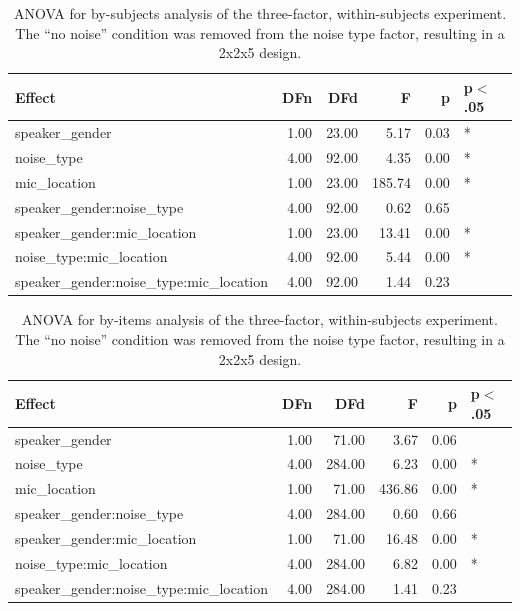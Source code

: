 \documentclass[dissertation,copyright]{uathesis}
\begin{document}
\begin{table}[ht]
\centering
\begin{tabular}{lrrrrl}
  \hline
Effect & DFn & DFd & F & p & p$<$.05 \\ 
  \hline
speaker\_gender & 1.00 & 23.00 & 5.17 & 0.03 & * \\ 
  noise\_type & 4.00 & 92.00 & 4.35 & 0.00 & * \\ 
  mic\_location & 1.00 & 23.00 & 185.74 & 0.00 & * \\ 
  speaker\_gender:noise\_type & 4.00 & 92.00 & 0.62 & 0.65 &  \\ 
  speaker\_gender:mic\_location & 1.00 & 23.00 & 13.41 & 0.00 & * \\ 
  noise\_type:mic\_location & 4.00 & 92.00 & 5.44 & 0.00 & * \\ 
  speaker\_gender:noise\_type:mic\_location & 4.00 & 92.00 & 1.44 & 0.23 &  \\ 
   \hline
\end{tabular}
\caption{ANOVA for by-subjects analysis of the three-factor, within-subjects experiment. The ``no noise'' condition was removed from the noise type factor, resulting in a 2x2x5 design.} 
\label{tab:anova1_by_subj}
\end{table}
\begin{table}[ht]
\centering
\begin{tabular}{lrrrrl}
  \hline
Effect & DFn & DFd & F & p & p$<$.05 \\ 
  \hline
speaker\_gender & 1.00 & 71.00 & 3.67 & 0.06 &  \\ 
  noise\_type & 4.00 & 284.00 & 6.23 & 0.00 & * \\ 
  mic\_location & 1.00 & 71.00 & 436.86 & 0.00 & * \\ 
  speaker\_gender:noise\_type & 4.00 & 284.00 & 0.60 & 0.66 &  \\ 
  speaker\_gender:mic\_location & 1.00 & 71.00 & 16.48 & 0.00 & * \\ 
  noise\_type:mic\_location & 4.00 & 284.00 & 6.82 & 0.00 & * \\ 
  speaker\_gender:noise\_type:mic\_location & 4.00 & 284.00 & 1.41 & 0.23 &  \\ 
   \hline
\end{tabular}
\caption{ANOVA for by-items analysis of the three-factor, within-subjects experiment. The ``no noise'' condition was removed from the noise type factor, resulting in a 2x2x5 design.} 
\label{tab:anova1_by_item}
\end{table}
\end{document}
